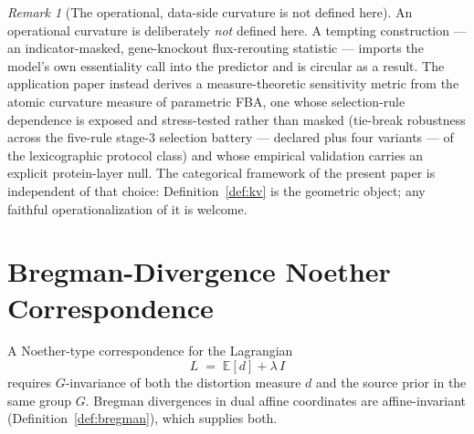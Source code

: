 \documentclass[11pt,a4paper]{article}
\theoremstyle{plain}
\theoremstyle{definition}
\theoremstyle{remark}
\newtheorem{remark}[theorem]{Remark}
\begin{document}
\begin{remark}[The operational, data-side curvature is not defined here]
\label{rem:fba-kappa-superseded}
An operational curvature is deliberately \emph{not} defined here. A tempting construction --- an indicator-masked, gene-knockout flux-rerouting statistic --- imports the model's own essentiality call into the predictor and is circular as a result. The application paper \citep{zai2026measure} instead derives a measure-theoretic sensitivity metric from the atomic curvature measure of parametric FBA, one whose selection-rule dependence is exposed and stress-tested rather than masked (tie-break robustness across the five-rule stage-3 selection battery --- declared plus four variants --- of the lexicographic protocol class) and whose empirical validation carries an explicit protein-layer null. The categorical framework of
the present paper is independent of that choice: Definition~\ref{def:kv}
is the geometric object; any faithful operationalization of it is
welcome.
\end{remark}


\section{Bregman-Divergence Noether Correspondence}\label{sec:noether}

A Noether-type correspondence for the Lagrangian
\begin{equation}\label{eq:lagrangian}
  L \;=\; \mathbb{E}[d] + \lambda\, I
\end{equation}
requires $G$-invariance of both the distortion measure $d$ and the
source prior in the same group $G$. Bregman divergences in dual affine
coordinates are affine-invariant (Definition~\ref{def:bregman}), which
supplies both.
\end{document}
